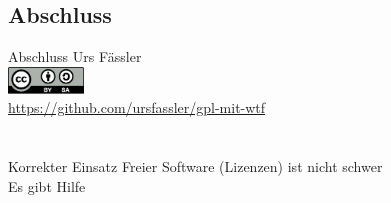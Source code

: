 
\subsection{Abschluss}
\label{sec:zusammenfassung}
\subsectionframe

\begin{frame}{Abschluss}
	\pause
	Urs Fässler\\
	\includegraphics[width=2cm]{res/cc-by-sa.pdf}\\
	\pause
	\url{https://github.com/ursfassler/gpl-mit-wtf}\\
	\pause
	\\
	\pause
	\\
	\pause
	Korrekter Einsatz Freier Software (Lizenzen) ist nicht schwer\\
	\pause
	Es gibt Hilfe
\end{frame}
